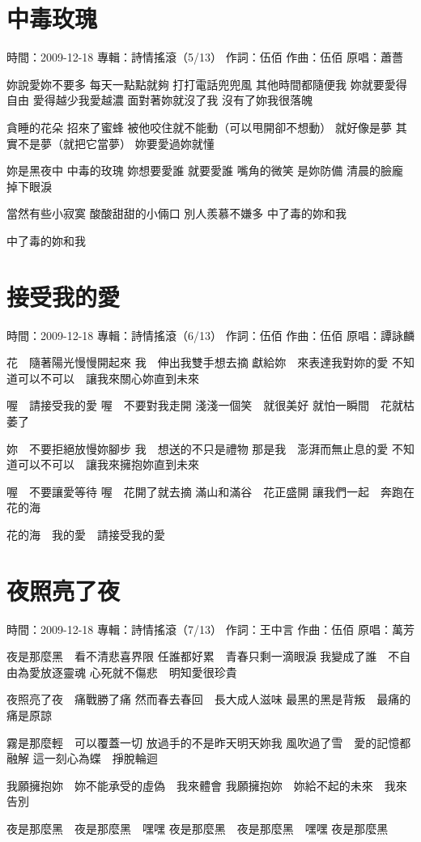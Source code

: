 \documentclass[UTF8,a4paper,oneside,twocolumn,12pt]{ctexbook}
\newcommand{\infopair}[2]{\textbullet #1：#2}
\newcommand{\zc}[1][伍佰]{\infopair{作詞}{#1}}
\newcommand{\zq}[1][伍佰]{\infopair{作曲}{#1}}
\newcommand{\zj}[1]{\infopair{專輯}{#1}}
\newcommand{\yc}[1]{\infopair{原唱}{#1}}
\newcommand{\sj}[1]{\infopair{時間}{#1}}
\newenvironment{info}{\begin{flushleft}\kaishu
	}
	{\end{flushleft}\normalsize\yahei\par}
\newenvironment{lyric}{
	}
{}
\begin{document}
\section{中毒玫瑰}
\begin{info}
	\sj{2009-12-18}
	\zj{詩情搖滾（5/13）}
	\zc
	\zq
	\yc{蕭薔}
\end{info}
\begin{lyric}
	妳說愛妳不要多 每天一點點就夠
	打打電話兜兜風 其他時間都隨便我
	妳就要愛得自由 愛得越少我愛越濃
	面對著妳就沒了我 沒有了妳我很落魄

	貪睡的花朵 招來了蜜蜂
	被他咬住就不能動（可以甩開卻不想動）
	就好像是夢 其實不是夢（就把它當夢）
	妳要愛過妳就懂

	妳是黑夜中 中毒的玫瑰
	妳想要愛誰 就要愛誰
	嘴角的微笑 是妳防備
	清晨的臉龐 掉下眼淚

	當然有些小寂寞 酸酸甜甜的小倆口
	別人羨慕不嫌多 中了毒的妳和我

	中了毒的妳和我
\end{lyric}

\section{接受我的愛}
\begin{info}
	\sj{2009-12-18}
	\zj{詩情搖滾（6/13）}
	\zc
	\zq
	\yc{譚詠麟}
\end{info}
\begin{lyric}
	花　隨著陽光慢慢開起來
	我　伸出我雙手想去摘
	獻給妳　來表達我對妳的愛
	不知道可以不可以　讓我來關心妳直到未來

	喔　請接受我的愛
	喔　不要對我走開
	淺淺一個笑　就很美好
	就怕一瞬間　花就枯萎了

	妳　不要拒絕放慢妳腳步
	我　想送的不只是禮物
	那是我　澎湃而無止息的愛
	不知道可以不可以　讓我來擁抱妳直到未來

	喔　不要讓愛等待
	喔　花開了就去摘
	滿山和滿谷　花正盛開
	讓我們一起　奔跑在花的海

	花的海　我的愛　請接受我的愛
\end{lyric}

\section{夜照亮了夜}
\begin{info}
	\sj{2009-12-18}
	\zj{詩情搖滾（7/13）}
	\zc[王中言]
	\zq
	\yc{萬芳}
\end{info}
\begin{lyric}
	夜是那麼黑　看不清悲喜界限
	任誰都好累　青春只剩一滴眼淚
	我變成了誰　不自由為愛放逐靈魂
	心死就不傷悲　明知愛很珍貴

	夜照亮了夜　痛戰勝了痛
	然而春去春回　長大成人滋味
	最黑的黑是背叛　最痛的痛是原諒

	霧是那麼輕　可以覆蓋一切
	放過手的不是昨天明天妳我
	風吹過了雪　愛的記憶都融解
	這一刻心為蝶　掙脫輪迴

	我願擁抱妳　妳不能承受的虛偽　我來體會
	我願擁抱妳　妳給不起的未來　我來告別

	夜是那麼黑　夜是那麼黑　嘿嘿
	夜是那麼黑　夜是那麼黑　嘿嘿
	夜是那麼黑
\end{lyric}
\end{document}
